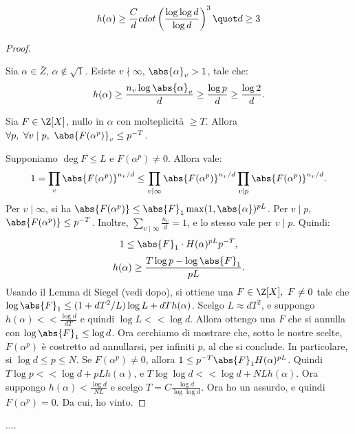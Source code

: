 \begin{theorem}[Dobrowolski 77]\label{Dobrowolski77}
	\begin{equation}
		h(\alpha)\geq \frac{C}{d} cdot \left(\frac{\log \log d}{\log d}\right)^3 \quot d \geq 3
	\end{equation}
\end{theorem}
\begin{proof}
	\begin{observation}\label{oss1}
		Sia $\alpha \in \bar{Z}$, $\alpha \notin \sqrt{1}$. Esiste $v \nmid \infty$, $\abs{\alpha}_v>1$, tale che:
		\[
		h(\alpha)\geq \frac{n_v\log \abs{\alpha}_v}{d}\geq \frac{\log p}{d} \geq \frac{\log 2}{d}.
		\]
	\end{observation}
	\begin{observation}\label{oss2}
	Sia $F \in \Z[X]$, nullo in $\alpha$ con molteplicità $\geq T$. Allora $\forall p, \ \forall v \mid p, \ \abs{F(\alpha^p)}_v \leq p^{-T}$.
	\end{observation}
	Supponiamo $\deg F \leq L$ e $F(\alpha^p) \neq 0$. Allora vale:
	\[
	1=\prod_v\abs{F(\alpha^p)}^{n_v/d}\leq \prod_{v \mid \infty}\abs{F(\alpha^p)}^{n_v/d}\prod_{v \mid p} \abs{F(\alpha^p)}^{n_v/d}.
	\]
	Per $v \mid \infty$, si ha $\abs{F(\alpha^p)} \leq \abs{F}_1\max(1,\abs{\alpha})^{pL}$. Per $v \mid p$, $\abs{F(\alpha^p)}\leq p^{-T}$. Inoltre, $\sum_{v \mid \infty} \frac{n_v}{d}=1$, e lo stesso vale per $v \mid p$. Quindi:
	\[
	1 \leq \abs{F}_1\cdot H(\alpha)^{pL}p^{-T},
	\]
	\[
	h(\alpha) \geq \frac{T \log p - \log \abs{F}_1}{pL}.
	\]
	Usando il Lemma di Siegel (vedi dopo), si ottiene una $F \in \Z[X], \ F \neq 0$ tale che $\log \abs{F}_1 \leq (1+dT^2/L)\log L+dTh(\alpha)$. Scelgo $L \approx dT^2$, e suppongo $h(\alpha) << \frac{\log d}{dT}$ e quindi $\log L << \log d$. Allora ottengo una $F$ che si annulla con $\log \abs{F}_1 \leq \log d$. Ora cerchiamo di mostrare che, sotto le nostre scelte, $F(\alpha^p)$ è costretto ad annullarsi, per infiniti $p$, al che si conclude. In particolare, si $\log d \leq p \leq N$. Se $F(\alpha^p) \neq 0$, allora $1 \leq p^{-T}\abs{F}_1H(\alpha)^{pL}$. Quindi $T \log p << \log d+ pL h(\alpha)$, e $T \log \log d << \log d +NLh(\alpha)$. Ora suppongo $h(\alpha)<\frac{\log d}{NL}$ e scelgo $T=C\frac{\log d}{\log \log d}$. Ora ho un assurdo, e quindi $F(\alpha^p)=0$. Da cui, ho vinto.
\end{proof}
\begin{lemma}
	....
\end{lemma}